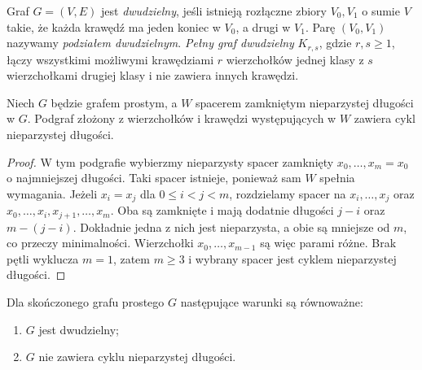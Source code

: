 \begin{definicja}
Graf $G=(V,E)$ jest \emph{dwudzielny}, jeśli istnieją
rozłączne zbiory $V_0,V_1$ o sumie $V$ takie, że
każda krawędź ma jeden koniec w $V_0$, a drugi
w $V_1$. Parę $(V_0,V_1)$ nazywamy \emph{podziałem
dwudzielnym}. \emph{Pełny graf dwudzielny} $K_{r,s}$,
gdzie $r,s\ge1$, łączy wszystkimi możliwymi krawędziami
$r$ wierzchołków jednej klasy z $s$ wierzchołkami
drugiej klasy i nie zawiera innych krawędzi.
\end{definicja}

\begin{lemat}
\label{lem:tg-odd-closed-walk}
Niech $G$ będzie grafem prostym, a $W$ spacerem zamkniętym
nieparzystej długości w $G$. Podgraf złożony z wierzchołków
i krawędzi występujących w $W$ zawiera cykl nieparzystej długości.
\end{lemat}

\begin{proof}
W tym podgrafie wybierzmy nieparzysty spacer zamknięty
$x_0,\ldots,x_m=x_0$ o najmniejszej długości. Taki spacer
istnieje, ponieważ sam $W$ spełnia wymagania.
Jeżeli $x_i=x_j$ dla $0\le i<j<m$, rozdzielamy spacer
na $x_i,\ldots,x_j$ oraz
$x_0,\ldots,x_i,x_{j+1},\ldots,x_m$.
Oba są zamknięte i mają dodatnie długości $j-i$
oraz $m-(j-i)$. Dokładnie jedna z nich jest nieparzysta,
a obie są mniejsze od $m$, co przeczy minimalności.
Wierzchołki $x_0,\ldots,x_{m-1}$ są więc parami różne.
Brak pętli wyklucza $m=1$, zatem $m\ge3$ i wybrany
spacer jest cyklem nieparzystej długości.
\end{proof}

\begin{twierdzenie}
Dla skończonego grafu prostego $G$ następujące
warunki są równoważne:
\begin{enumerate}[label=(\roman*)]
\item $G$ jest dwudzielny;
\item $G$ nie zawiera cyklu nieparzystej długości.
\end{enumerate}
\end{twierdzenie}

